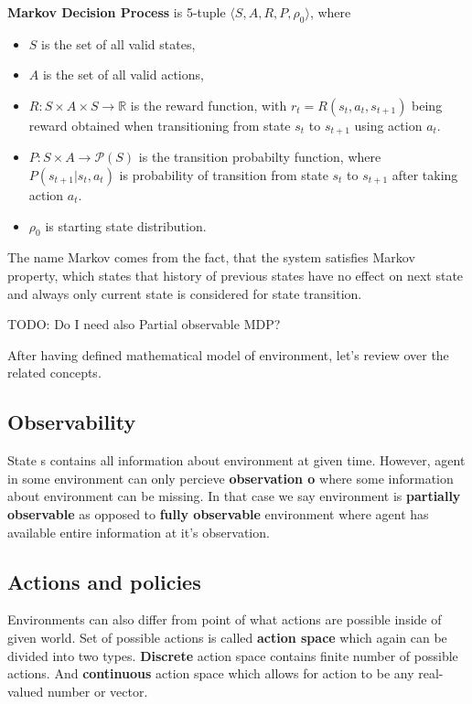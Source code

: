 \textbf{Markov Decision Process} is 5-tuple $\langle S, A, R, P, \rho_0\rangle$, where
\begin{itemize}
    \item $S$ is the set of all valid states,
    \item $A$ is the set of all valid actions,
    \item $R: S \times A \times S \rightarrow \mathbb{R}$ is the reward function, with $r_t=R(s_t, a_t,s_{t+1})$ being reward obtained when transitioning from state $s_t$ to $s_{t+1}$ using action $a_t$.
    \item $P: S \times A \rightarrow \mathcal{P}(S)$ is the transition probabilty function, where $P(s_{t+1}|s_t, a_t)$ is probability of transition from state $s_t$ to $s_{t+1}$ after taking action $a_t$. 
    \item $\rho_0$ is starting state distribution.
\end{itemize}
The name Markov comes from the fact, that the system satisfies Markov property, which states that history of previous states have no effect on next state and always only current state is considered for state transition.

TODO: Do I need also Partial observable MDP?

After having defined mathematical model of environment, let's review over the related concepts.

\subsection*{Observability}
State s contains all information about environment at given time. 
However, agent in some environment can only percieve \textbf{observation o} where some information about environment can be missing.
In that case we say environment is \textbf{partially observable} as opposed to \textbf{fully observable} environment where agent has available entire information at it's observation.

\subsection*{Actions and policies}
Environments can also differ from point of what actions are possible inside of given world.
Set of possible actions is called \textbf{action space} which again can be divided into two types. 
\textbf{Discrete} action space contains finite number of possible actions. 
And \textbf{continuous} action space which allows for action to be any real-valued number or vector.

